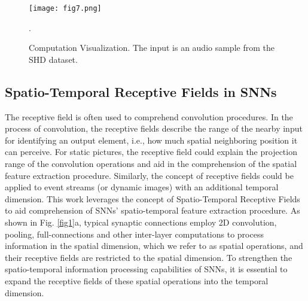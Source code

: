\documentclass[letterpaper]{article} \usepackage[submission]{aaai23}  \usepackage{times}  \usepackage{helvet}  \usepackage{courier}  \usepackage[hyphens]{url}  \usepackage{graphicx} \urlstyle{rm} \def\UrlFont{\rm}  \usepackage{natbib}  \usepackage{caption} \frenchspacing  \setlength{\pdfpagewidth}{8.5in} \setlength{\pdfpageheight}{11in} \usepackage{algorithm}
\begin{document}
\begin{figure}[t]
\centering
\texttt{[image: fig7.png]} 
\caption{Computation Visualization. The input is an audio sample from the SHD dataset.
}.
\label{fig7}
\end{figure}

\subsection{Spatio-Temporal Receptive Fields in SNNs}
The receptive field is often used to comprehend convolution procedures. In the process of convolution, the receptive fields describe the range of the nearby input for identifying an output element, i.e., how much spatial neighboring position it can perceive.
For static pictures, the receptive field could explain the projection range of the convolution operations and aid in the comprehension of the spatial feature extraction procedure. 
Similarly, the concept of receptive fields could be applied to event streams (or dynamic images) with an additional temporal dimension.
This work leverages the concept of Spatio-Temporal Receptive Fields to aid comprehension of SNNs' spatio-temporal feature extraction procedure. 
As shown in Fig. \ref{fig1}a,  typical synaptic connections employ 2D convolution, pooling, full-connections and other inter-layer computations to process information in the spatial dimension, which we refer to as spatial operations, and their receptive fields are restricted to the spatial dimension.
To strengthen the spatio-temporal information processing capabilities of SNNs, it is essential to expand the receptive fields of these spatial operations into the temporal dimension.
\end{document}

